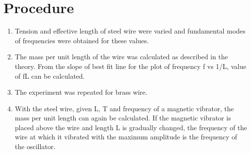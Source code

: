 \section{Procedure}
	\begin{enumerate}
		\item Tension and effective length of steel wire were varied and fundamental modes of frequencies were obtained for these values. 
		\item The mass per unit length of the wire was calculated as described in the theory. From the slope of best fit line for the plot of frequency f vs 1/L, value of fL can be calculated.
		\item The experiment was repeated for brass wire.
		\item With the steel wire, given L, T and frequency of a magnetic vibrator, the mass per unit length can again be calculated. If the magnetic vibrator is placed above the wire and length L is gradually changed, the frequency of the wire at which it vibrated with the maximum amplitude is the frequency of the oscillator.
	\end{enumerate}
	
